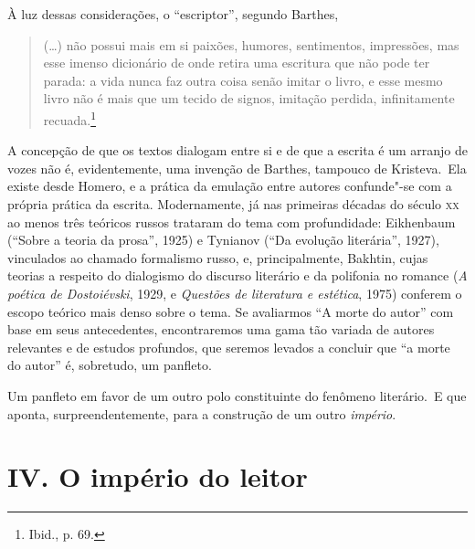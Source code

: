 À luz dessas considerações, o ``escriptor'', segundo Barthes,

\begin{quote}
(\ldots{}) não possui mais em si paixões, humores, sentimentos, impressões,
mas esse imenso dicionário de onde retira uma escritura que não pode ter
parada: a vida nunca faz outra coisa senão imitar o livro, e esse mesmo
livro não é mais que um tecido de signos, imitação perdida,
infinitamente recuada.\footnote{Ibid., p. 69.}
\end{quote}

A concepção de que os textos dialogam entre si e de que a escrita é um
arranjo de vozes não é, evidentemente, uma invenção de Barthes, tampouco
de Kristeva.~Ela existe desde Homero, e a prática da emulação entre
autores confunde"-se com a própria prática da escrita. Modernamente, já nas primeiras décadas
do século \textsc{xx} ao menos três teóricos russos trataram do tema com
profundidade: Eikhenbaum (``Sobre a teoria da prosa'', 1925) e Tynianov
(``Da evolução literária'', 1927), vinculados ao chamado formalismo
russo, e, principalmente, Bakhtin, cujas teorias a respeito do
dialogismo do discurso literário e da polifonia no romance (\emph{A poética de
Dostoiévski}, 1929, e \emph{Questões de literatura e estética}, 1975) conferem o
escopo teórico mais denso sobre o tema. Se avaliarmos ``A morte do
autor'' com base em seus antecedentes, encontraremos uma gama tão
variada de autores relevantes e de estudos profundos, que seremos
levados a concluir que ``a morte do autor'' é, sobretudo, um panfleto.

Um panfleto em favor de um outro polo constituinte do fenômeno
literário.~E que aponta, surpreendentemente, para a construção de um outro \emph{império}.

\section*{IV. O império do leitor}

